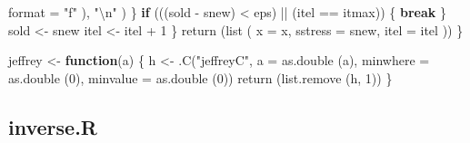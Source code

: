 \documentclass[
  12pt,
  letterpaper,
  DIV=11,
  numbers=noendperiod]{scrreprt}
\newenvironment{Shaded}{\begin{snugshade}}{\end{snugshade}}
\newcommand{\AttributeTok}[1]{\textcolor[rgb]{0.40,0.45,0.13}{#1}}
\newcommand{\ControlFlowTok}[1]{\textcolor[rgb]{0.00,0.23,0.31}{\textbf{#1}}}
\newcommand{\DecValTok}[1]{\textcolor[rgb]{0.68,0.00,0.00}{#1}}
\newcommand{\FunctionTok}[1]{\textcolor[rgb]{0.28,0.35,0.67}{#1}}
\newcommand{\NormalTok}[1]{\textcolor[rgb]{0.00,0.23,0.31}{#1}}
\newcommand{\OtherTok}[1]{\textcolor[rgb]{0.00,0.23,0.31}{#1}}
\newcommand{\SpecialCharTok}[1]{\textcolor[rgb]{0.37,0.37,0.37}{#1}}
\newcommand{\StringTok}[1]{\textcolor[rgb]{0.13,0.47,0.30}{#1}}
\theoremstyle{remark}
\begin{document}
\begin{Shaded}
\begin{Highlighting}[]
            \AttributeTok{format =} \StringTok{"f"}
\NormalTok{          ),}
          \StringTok{"}\SpecialCharTok{\textbackslash{}n}\StringTok{"}
\NormalTok{        )}
\NormalTok{      \}}
      \ControlFlowTok{if}\NormalTok{ (((sold }\SpecialCharTok{{-}}\NormalTok{ snew) }\SpecialCharTok{\textless{}}\NormalTok{ eps) }\SpecialCharTok{||}\NormalTok{ (itel }\SpecialCharTok{==}\NormalTok{ itmax)) \{}
        \ControlFlowTok{break}
\NormalTok{      \}}
\NormalTok{      sold }\OtherTok{\textless{}{-}}\NormalTok{ snew}
\NormalTok{      itel }\OtherTok{\textless{}{-}}\NormalTok{ itel }\SpecialCharTok{+} \DecValTok{1}
\NormalTok{    \}}
    \FunctionTok{return}\NormalTok{ (}\FunctionTok{list}\NormalTok{ (}
      \AttributeTok{x =}\NormalTok{ x,}
      \AttributeTok{sstress =}\NormalTok{ snew,}
      \AttributeTok{itel =}\NormalTok{ itel}
\NormalTok{    ))}
\NormalTok{  \}}

\NormalTok{jeffrey }\OtherTok{\textless{}{-}} \ControlFlowTok{function}\NormalTok{(a) \{}
\NormalTok{  h }\OtherTok{\textless{}{-}}
    \FunctionTok{.C}\NormalTok{(}\StringTok{"jeffreyC"}\NormalTok{,}
       \AttributeTok{a =} \FunctionTok{as.double}\NormalTok{ (a),}
       \AttributeTok{minwhere =} \FunctionTok{as.double}\NormalTok{ (}\DecValTok{0}\NormalTok{),}
       \AttributeTok{minvalue =} \FunctionTok{as.double}\NormalTok{ (}\DecValTok{0}\NormalTok{))}
  \FunctionTok{return}\NormalTok{ (}\FunctionTok{list.remove}\NormalTok{ (h, }\DecValTok{1}\NormalTok{))}
\NormalTok{\}}
\end{Highlighting}
\end{Shaded}

\subsection*{inverse.R}\label{apcodeinverse}
\end{document}

